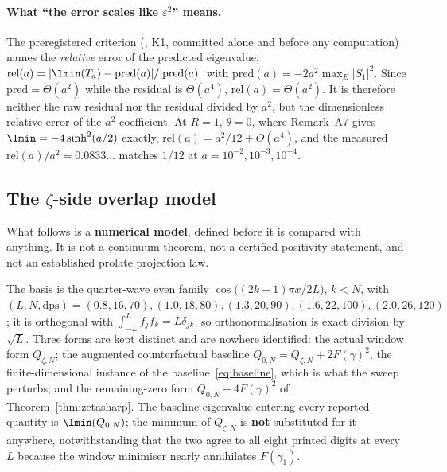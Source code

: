 \paragraph{What ``the error scales like $\varepsilon^{2}$'' means.}
The preregistered criterion (, K1,
committed alone and before any computation) names the \emph{relative} error of the
predicted eigenvalue,
$\mathrm{rel}(a)=|\lmin(T_a)-\mathrm{pred}(a)|/|\mathrm{pred}(a)|$ with
$\mathrm{pred}(a)=-2a^{2}\max_E|S_1|^{2}$. Since $\mathrm{pred}=\Theta(a^{2})$ while the
residual is $\Theta(a^{4})$, $\mathrm{rel}(a)=\Theta(a^{2})$. It is therefore neither the
raw residual nor the residual divided by $a^{2}$, but the dimensionless relative error of
the $a^{2}$ coefficient. At $R=1$, $\theta=0$, where  Remark~A7 gives
$\lmin=-4\sinh^{2}(a/2)$ exactly, $\mathrm{rel}(a)=a^{2}/12+O(a^{4})$, and the measured
$\mathrm{rel}(a)/a^{2}=0.0833\ldots$ matches $1/12$ at $a=10^{-2},10^{-3},10^{-4}$.

\subsection{The $\zeta$-side overlap model}\label{ssec:pdszeta}

What follows is a \textbf{numerical model}, defined before it is compared with anything. It
is not a continuum theorem, not a certified positivity statement, and not an established
prolate projection law.

The basis is the quarter-wave even family $\cos\bigl((2k+1)\pi x/2L\bigr)$, $k<N$, with
$(L,N,\text{dps})=(0.8,16,70),(1.0,18,80),(1.3,20,90),(1.6,22,100),(2.0,26,120)$; it is
orthogonal with $\int_{-L}^{L}f_jf_k=L\delta_{jk}$, so orthonormalisation is exact division
by $\sqrt{L}$. Three forms are kept distinct and are nowhere identified: the actual window
form $Q_{\zeta,N}$; the augmented counterfactual baseline
$Q_{0,N}=Q_{\zeta,N}+2F(\gamma)^{2}$, the finite-dimensional instance of
the baseline~\eqref{eq:baseline}, which is what the sweep perturbs;
and the remaining-zero form $Q_{0,N}-4F(\gamma)^{2}$ of Theorem~\ref{thm:zetasharp}. The
baseline eigenvalue entering every reported quantity is $\lmin(Q_{0,N})$; the minimum of
$Q_{\zeta,N}$ is \textbf{not} substituted for it anywhere, notwithstanding that the two
agree to all eight printed digits at every $L$ because the window minimiser nearly
annihilates $F(\gamma_1)$.

